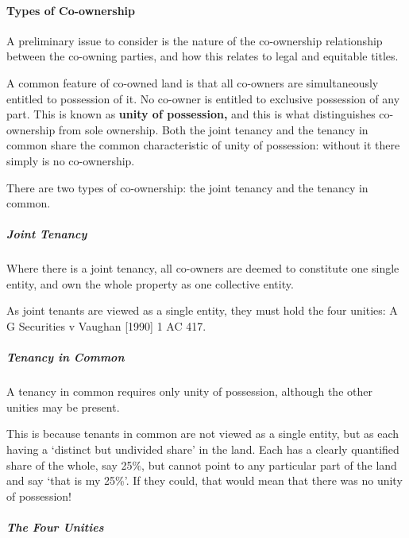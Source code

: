 \documentclass[
]{article}
\begin{document}
\hypertarget{types-of-co-ownership}{%
\paragraph{Types of Co-ownership}\label{types-of-co-ownership}}

A preliminary issue to consider is the nature of the co-ownership
relationship between the co-owning parties, and how this relates to
legal and equitable titles.

A common feature of co-owned land is that all co-owners are
simultaneously entitled to possession of it. No co-owner is entitled to
exclusive possession of any part. This is known as \textbf{unity of
possession,} and this is what distinguishes co-ownership from sole
ownership. Both the joint tenancy and the tenancy in common share the
common characteristic of unity of possession: without it there simply is
no co-ownership.

There are two types of co-ownership: the joint tenancy and the tenancy
in common.

\hypertarget{joint-tenancy}{%
\subparagraph{Joint Tenancy}\label{joint-tenancy}}

Where there is a joint tenancy, all co-owners are deemed to constitute
one single entity, and own the whole property as one collective entity.

As joint tenants are viewed as a single entity, they must hold the four
unities: A G Securities v Vaughan {[}1990{]} 1 AC 417.

\hypertarget{tenancy-in-common}{%
\subparagraph{Tenancy in Common}\label{tenancy-in-common}}

A tenancy in common requires only unity of possession, although the
other unities may be present.

This is because tenants in common are not viewed as a single entity, but
as each having a `distinct but undivided share' in the land. Each has a
clearly quantified share of the whole, say 25\%, but cannot point to any
particular part of the land and say `that is my 25\%'. If they could,
that would mean that there was no unity of possession!

\hypertarget{the-four-unities}{%
\subparagraph{The Four Unities}\label{the-four-unities}}
\end{document}
